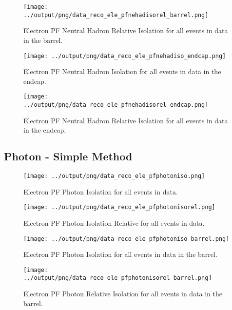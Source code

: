 \documentclass[11pt]{book}
\begin{document}
\begin{figure}[htb]
\centering
\texttt{[image: ../output/png/data\_reco\_ele\_pfnehadisorel\_barrel.png]}
\caption{Electron PF Neutral Hadron Relative Isolation for all events in data in the barrel.}
\label{fig:data_ele_pfnehadisorel_barrel}
\end{figure}

\begin{figure}[htb]
\centering
\texttt{[image: ../output/png/data\_reco\_ele\_pfnehadiso\_endcap.png]}
\caption{Electron PF Neutral Hadron Isolation for all events in data in the endcap.}
\label{fig:data_ele_pfnehadiso_endcap}
\end{figure}

\begin{figure}[htb]
\centering
\texttt{[image: ../output/png/data\_reco\_ele\_pfnehadisorel\_endcap.png]}
\caption{Electron PF Neutral Hadron Relative Isolation for all events in data in the endcap.}
\label{fig:data_ele_pfnehadisorel_endcap}
\end{figure}
\clearpage

\subsection{Photon - Simple Method}
\begin{figure}[htb]
\centering
\texttt{[image: ../output/png/data\_reco\_ele\_pfphotoniso.png]}
\caption{Electron PF Photon Isolation for all events in data.}
\label{fig:data_ele_pfphotoniso}
\end{figure}

\begin{figure}[htb]
\centering
\texttt{[image: ../output/png/data\_reco\_ele\_pfphotonisorel.png]}
\caption{Electron PF Photon Isolation Relative for all events in data.}
\label{fig:data_ele_pfphotonisorel}
\end{figure}

\begin{figure}[htb]
\centering
\texttt{[image: ../output/png/data\_reco\_ele\_pfphotoniso\_barrel.png]}
\caption{Electron PF Photon Isolation for all events in data in the barrel.}
\label{fig:data_ele_pfphotoniso_barrel}
\end{figure}

\begin{figure}[htb]
\centering
\texttt{[image: ../output/png/data\_reco\_ele\_pfphotonisorel\_barrel.png]}
\caption{Electron PF Photon Relative Isolation for all events in data in the barrel.}
\label{fig:data_ele_pfphotonisorel_barrel}
\end{figure}
\end{document}
